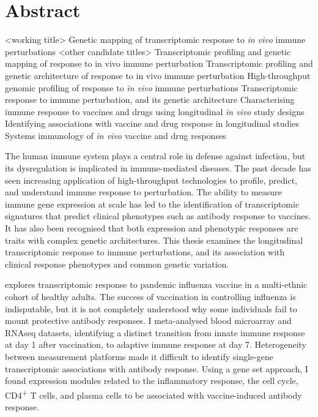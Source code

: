 %
%
\chapter*{Abstract}

\begin{outline}

\1 <working title>
    \2 Genetic mapping of transcriptomic response to \textit{in vivo} immune perturbations
\1 <other candidate titles>
    \2 Transcriptomic profiling and genetic mapping of response to in vivo immune perturbation
    \2 Transcriptomic profiling and genetic architecture of response to in vivo immune perturbation
    \2 High-throughput genomic profiling of response to \textit{in vivo} immune perturbations
    \2 Transcriptomic response to immune perturbation, and its genetic architecture
    \2 Characterising immune response to vaccines and drugs using longitudinal \textit{in vivo} study designs
    \2 Identifying associations with vaccine and drug response in longitudinal studies
    \2 Systems immunology of \textit{in vivo} vaccine and drug responses

\end{outline}

The human immune system plays a central role in defense against infection, 
but its dysregulation is implicated in immune-mediated diseases.
The past decade has seen increasing application of high-throughput technologies to profile, predict, and understand immune response to perturbation.
The ability to measure immune gene expression at scale has led to the identification of 
transcriptomic signatures that predict clinical phenotypes such as antibody response to vaccines.
It has also been recognised that both expression and phenotypic responses are traits with complex genetic architectures.
This thesis examines the longitudinal transcriptomic response to immune perturbations,
and its association with clinical response phenotypes and common genetic variation.

 explores transcriptomic response to pandemic influenza vaccine in a multi-ethnic cohort of healthy adults.
The success of vaccination in controlling influenza is indisputable, 
but it is not completely understood why some individuals fail to mount protective antibody responses.
I meta-analysed blood microarray and \gls{RNAseq} datasets, 
identifying a distinct transition from innate immune response at day 1 after vaccination, to adaptive immune response at day 7.
Heterogeneity between measurement platforms made it difficult to identify single-gene transcriptomic associations with antibody response.
Using a gene set approach, I found expression modules related to the inflammatory response, the cell cycle, CD4\textsuperscript{+} T cells, and plasma cells 
to be associated with vaccine-induced antibody response.

